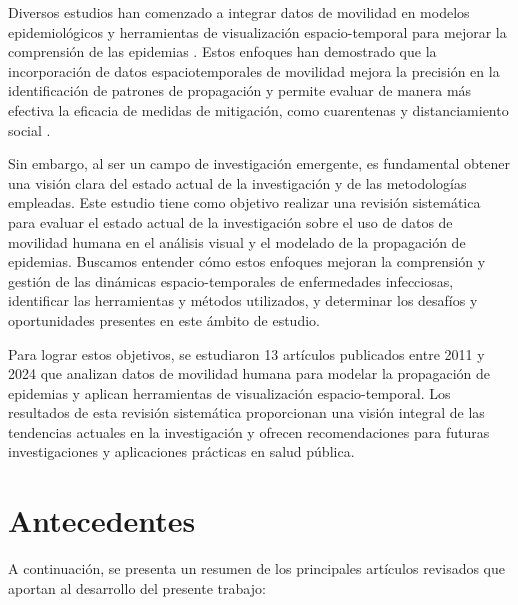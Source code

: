 \documentclass[sigconf]{acmart}
\begin{document}
Diversos estudios han comenzado a integrar datos de movilidad en modelos epidemiológicos y herramientas de visualización espacio-temporal para mejorar la comprensión de las epidemias \cite{li2024vivian, kim2024scoping}. Estos enfoques han demostrado que la incorporación de datos espaciotemporales de movilidad mejora la precisión en la identificación de patrones de propagación y permite evaluar de manera más efectiva la eficacia de medidas de mitigación, como cuarentenas y distanciamiento social \cite{yanez2021pandemcap, afzal2011visual}.

Sin embargo, al ser un campo de investigación emergente, es fundamental obtener una visión clara del estado actual de la investigación y de las metodologías empleadas. Este estudio tiene como objetivo realizar una revisión sistemática para evaluar el estado actual de la investigación sobre el uso de datos de movilidad humana en el análisis visual y el modelado de la propagación de epidemias. Buscamos entender cómo estos enfoques mejoran la comprensión y gestión de las dinámicas espacio-temporales de enfermedades infecciosas, identificar las herramientas y métodos utilizados, y determinar los desafíos y oportunidades presentes en este ámbito de estudio.

Para lograr estos objetivos, se estudiaron 13 artículos publicados entre 2011 y 2024 que analizan datos de movilidad humana para modelar la propagación de epidemias y aplican herramientas de visualización espacio-temporal. Los resultados de esta revisión sistemática proporcionan una visión integral de las tendencias actuales en la investigación y ofrecen recomendaciones para futuras investigaciones y aplicaciones prácticas en salud pública.

\section{Antecedentes}
A continuación, se presenta un resumen de los principales artículos revisados que aportan al desarrollo del presente trabajo:
\end{document}
